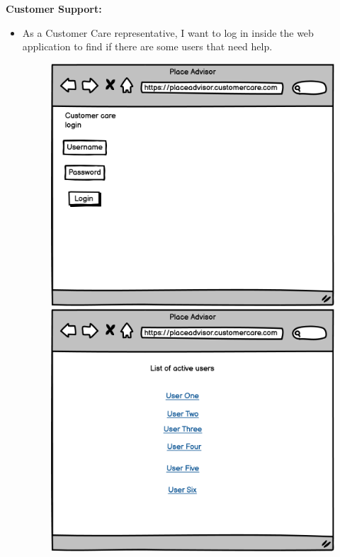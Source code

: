 \documentclass[../main.tex]{subfiles}
\begin{document}
\textbf{Customer Support:}
\begin{itemize}
  \item As a Customer Care representative, I want to log in inside the web application to find if there are some users that need help.
  \begin{figure}[h]
\begin{multicols}{2}
    \includegraphics[width=\linewidth]{../figures/mockup/US10 copy.png}\par 
    \includegraphics[width=\linewidth]{../figures/mockup/US10 copy 2.png}\par 

\end{multicols}
\end{figure}
\end{itemize}
\end{document}

